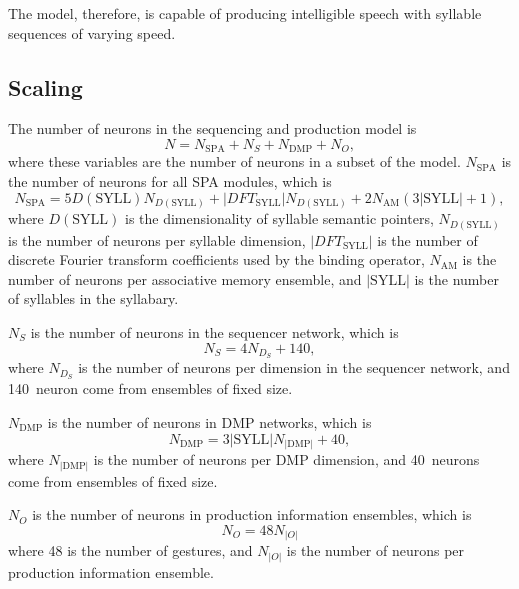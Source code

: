 The model, therefore,
is capable of producing intelligible speech
with syllable sequences of varying speed.

\subsection{Scaling}
\label{sec:res-prod-scaling}

The number of neurons in the
sequencing and production model is
\begin{equation}
  N = N_{\text{SPA}} + N_S + N_{\text{DMP}} + N_O,
\end{equation}
where these variables
are the number of neurons in
a subset of the model.
$N_{\text{SPA}}$ is the number of
neurons for all SPA modules,
which is
\begin{equation}
  N_{\text{SPA}} = 5 D(\text{SYLL}) N_{D(\text{SYLL})} +
      |DFT_{\text{SYLL}}| N_{D(\text{SYLL})}
      + 2 N_{\text{AM}} (3 |\text{SYLL}| + 1),
\end{equation}
where $D(\text{SYLL})$ is the dimensionality
of syllable semantic pointers,
$N_{D(\text{SYLL})}$ is the number of neurons
per syllable dimension,
$|DFT_{\text{SYLL}}|$ is the number of
discrete Fourier transform coefficients
used by the binding operator,
$N_{\text{AM}}$ is the number of neurons
per associative memory ensemble,
and $|\text{SYLL}|$ is the number of
syllables in the syllabary.

$N_S$ is the number of neurons
in the sequencer network,
which is
\begin{equation}
  N_S = 4 N_D_S + 140,
\end{equation}
where $N_D_S$ is the number of neurons
per dimension in the sequencer network,
and 140~neuron come from ensembles
of fixed size.

$N_{\text{DMP}}$ is the number of neurons
in DMP networks, which is
\begin{equation}
  N_{\text{DMP}} = 3 |\text{SYLL}| N_{|\text{DMP}|} + 40,
\end{equation}
where $N_{|\text{DMP}|}$ is the number of neurons
per DMP dimension,
and 40~neurons come from ensembles of fixed size.

$N_O$ is the number of neurons
in production information ensembles, which is
\begin{equation}
  N_O = 48 N_{|O|}
\end{equation}
where 48 is the number of gestures,
and $N_{|O|}$ is the number of neurons
per production information ensemble.

